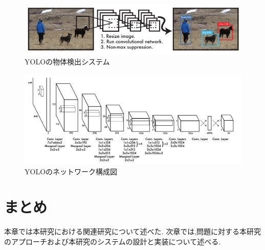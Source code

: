 \begin{figure}[htbp]
  \begin{center}
    \includegraphics[width=\textwidth]{figs/Yolo_Detection_system.png}
    \caption{YOLOの物体検出システム\cite{yolov3}}
    \label{fig:yolo_system}
  \end{center}
\end{figure}

\begin{figure}[htbp]
  \begin{center}
    \includegraphics[width=\textwidth]{figs/yolo_architecture.png}
    \caption{YOLOのネットワーク構成図\cite{yolov3}}
    \label{fig:yolo_network}
  \end{center}
 \end{figure}
 
 \section{まとめ}
 本章では本研究における関連研究について述べた.
 次章では,問題に対する本研究のアプローチおよび本研究のシステムの設計と実装について述べる.